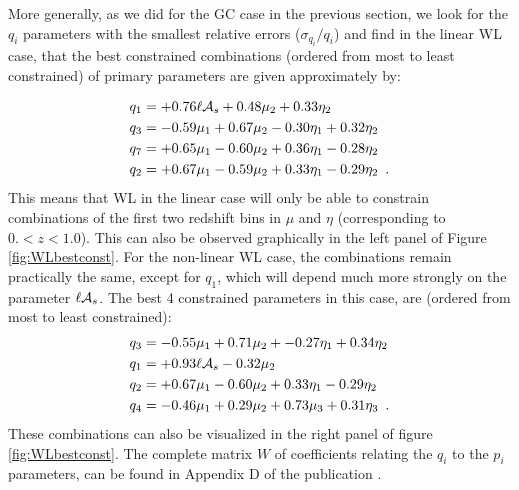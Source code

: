 More generally, as we did for the GC case in the previous section, we look for the $q_i$ 
parameters with the smallest relative errors ($\sigma_{q_i}/q_i$) and find in the linear WL case, that the best 
constrained combinations (ordered from most to least constrained) of primary parameters are given approximately by: 

\begin{equation} \label{eq:bestCombined-WLlin}
\begin{aligned}
	q_1  &= +0.76\ell \mathcal{A}_{s} + 0.48 \mu_2 + 0.33\eta_2 \\
	q_3  &= -0.59\mu_1 + 0.67 \mu_2 - 0.30\eta_1 + 0.32 \eta_2\\
	q_7  &= +0.65\mu_1 - 0.60 \mu_2 + 0.36\eta_1 - 0.28 \eta_2\\
	q_2  &= +0.67\mu_1 - 0.59 \mu_2 + 0.33\eta_1 - 0.29 \eta_2 \,\,\, .
\end{aligned}
\end{equation}
This means that WL in the linear case will only be able to constrain 
combinations of the first two redshift bins in $\mu$ and $\eta$ (corresponding to  $ 0. < z < 1.0 $).
This can also be observed graphically in the left panel of Figure \ref{fig:WLbestconst}.
For the non-linear WL case, the combinations remain practically the same, except for $q_1$, which will depend much more strongly on the parameter $\ell \mathcal{A}_{s}$. The best 4 constrained parameters in this case, are (ordered from most to least constrained):
\begin{equation} \label{eq:bestCombined-WLnonlin}
\begin{aligned}
	q_3  &= -0.55\mu_1 + 0.71 \mu_2 + -0.27\eta_1 + 0.34\eta_2\\            
	q_1  &= +0.93\ell \mathcal{A}_{s} - 0.32\mu_2 \\ 
	q_2  &= +0.67\mu_1 - 0.60 \mu_2 + 0.33\eta_1 - 0.29 \eta_2\\
	q_4  &= -0.46\mu_1 + 0.29 \mu_2 + 0.73\mu_3 + 0.31 \eta_3 \,\,\, .
\end{aligned}
\end{equation}
These combinations can also be visualized in the right panel of figure \ref{fig:WLbestconst}.
The complete matrix $W$ of coefficients relating the $q_i$ to the $p_i$ parameters, 
can be found in Appendix D of the publication \cite{casas_linear_2017}.

